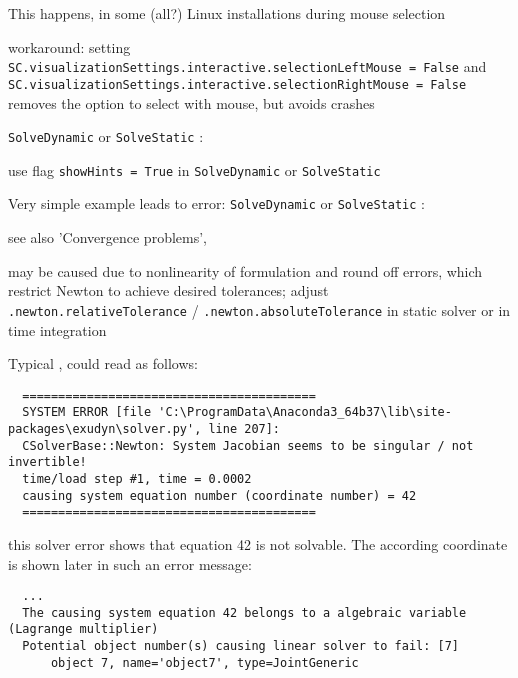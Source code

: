 \bi
\item[$\ra$] This happens, in some (all?) Linux installations during mouse selection
\item[$\ra$] workaround: setting \texttt{SC.visualizationSettings.interactive.selectionLeftMouse = False} and \texttt{SC.visualizationSettings.interactive.selectionRightMouse = False} removes the option to select with mouse, but avoids crashes
\ei
\item \texttt{SolveDynamic} or \texttt{SolveStatic} :
\bi
\item[$\ra$] use flag \texttt{showHints = True} in \texttt{SolveDynamic} or \texttt{SolveStatic}
\ei
\item Very simple example  leads to error: \texttt{SolveDynamic} or \texttt{SolveStatic} :
\bi
\item[$\ra$] see also 'Convergence problems', 
\item[$\ra$] may be caused due to nonlinearity of formulation and round off errors, which restrict Newton to achieve desired tolerances; adjust  \texttt{.newton.relativeTolerance} / \texttt{.newton.absoluteTolerance} in static solver or in time integration
\ei
\item Typical , could read as follows:
\begin{lstlisting}
  =========================================
  SYSTEM ERROR [file 'C:\ProgramData\Anaconda3_64b37\lib\site-packages\exudyn\solver.py', line 207]: 
  CSolverBase::Newton: System Jacobian seems to be singular / not invertible!
  time/load step #1, time = 0.0002
  causing system equation number (coordinate number) = 42
  =========================================
\end{lstlisting}
\onlyRST{\rstStartNewLine}
%
\bi
\item[$\ra$] this solver error shows that equation 42 is not solvable. The according coordinate is shown later in such an error message:
\ei
\begin{lstlisting}
  ...
  The causing system equation 42 belongs to a algebraic variable (Lagrange multiplier)
  Potential object number(s) causing linear solver to fail: [7]
      object 7, name='object7', type=JointGeneric
\end{lstlisting}
\onlyRST{\rstStartNewLine}
